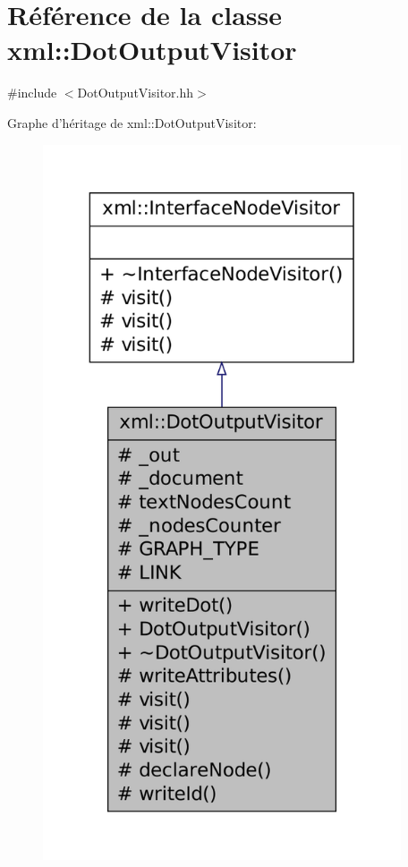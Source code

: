 \hypertarget{classxml_1_1_dot_output_visitor}{
\section{Référence de la classe xml::DotOutputVisitor}
\label{classxml_1_1_dot_output_visitor}
}


{\ttfamily \#include $<$DotOutputVisitor.hh$>$}



Graphe d'héritage de xml::DotOutputVisitor:\nopagebreak
\begin{figure}[H]
\begin{center}
\leavevmode
\includegraphics[height=600pt]{classxml_1_1_dot_output_visitor__inherit__graph}
\end{center}
\end{figure}


